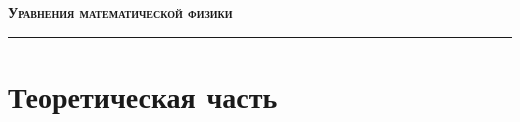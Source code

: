 \documentclass[12pt]{article}
\begin{document}
	
	\begin{center}
		\LARGE \bf	
		\textsc{Уравнения математической физики}
		\rule{\textwidth}{0.4pt}
	\end{center}
	
	\section{Теоретическая часть}
	
	 \newpage
	 \newpage
	 \newpage
	 \newpage
	 \newpage
	 \newpage
	 \newpage
	 \newpage
	 \newpage
	 \newpage
	 \newpage
	 \newpage
	 \newpage
	 \newpage
	 \newpage
	 \newpage
	 \newpage
	 \newpage
	 \newpage
	 \newpage
	 \newpage
	 \newpage
	 \newpage
	 \newpage
	 \newpage
	 \newpage
	 \newpage
	 \newpage
	 \newpage
	 \newpage
	 \newpage
	 \newpage
	 \newpage
	
\end{document}
